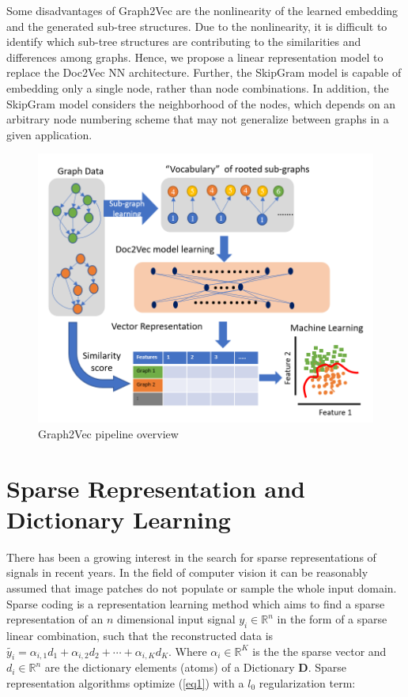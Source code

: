 Some disadvantages of Graph2Vec are the nonlinearity of the learned embedding and the generated sub-tree structures. Due to the nonlinearity, it is difficult to identify which sub-tree structures are contributing to the similarities and differences among graphs. Hence, we propose a linear representation model to replace the Doc2Vec NN architecture. Further, the SkipGram model is capable of embedding only a single node, rather than node combinations. In addition, the SkipGram model considers the neighborhood of the nodes, which depends on an arbitrary node numbering scheme that may not generalize between graphs in a given application.

\begin{figure}[!tbh]
\centerline{\includegraphics[width=0.9\columnwidth]{figures/Graph_embedding/Gaph2Vec.png}}
\caption{Graph2Vec pipeline overview}\label{fig: G2V}
\end{figure}

\section{Sparse Representation and Dictionary Learning}

There has been a growing interest in the search for sparse representations of signals in recent years. In the field of computer vision it can be reasonably assumed that image patches do not populate or sample the whole input domain\cite{Elad2010}. Sparse coding is a representation learning method which aims to find a sparse representation of an  $n$ dimensional input signal $y_i \in \mathbb{R}^n $ in the form of a sparse linear combination, such that the reconstructed data is $\tilde{y_i} = \alpha_{i,1} d_1 + \alpha_{i,2} d_2 + \cdots + \alpha_{i,K} d_K$. Where $\alpha_i \in \mathbb{R}^K$ is the the sparse vector and  $d_i \in \mathbb{R}^n $ are the dictionary elements (atoms) of a Dictionary $\mathbf{D}$. Sparse representation algorithms optimize  (\ref{eq1}) with a $l_0$ regularization term:


